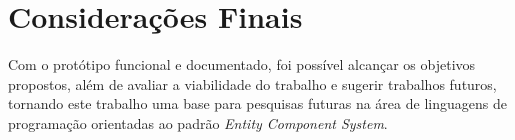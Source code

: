 \section{Considerações Finais}

Com o protótipo funcional e documentado, foi possível alcançar os objetivos propostos, além de avaliar a viabilidade do trabalho e sugerir trabalhos futuros, tornando este trabalho uma base para pesquisas futuras na área de linguagens de programação orientadas ao padrão \textit{Entity Component System}.
